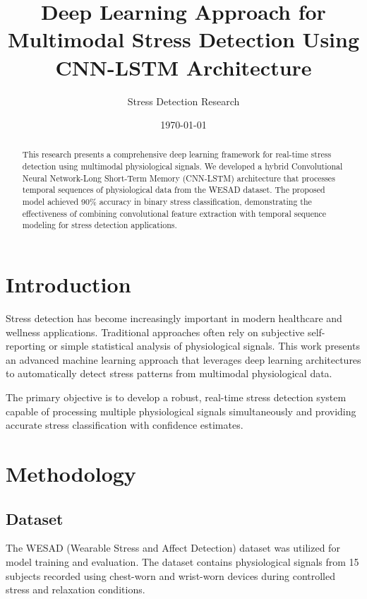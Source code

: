 \documentclass[11pt,a4paper]{article}
\title{Deep Learning Approach for Multimodal Stress Detection Using CNN-LSTM Architecture}
\author{Stress Detection Research}
\date{\today}
\begin{document}
\maketitle

\begin{abstract}
This research presents a comprehensive deep learning framework for real-time stress detection using multimodal physiological signals. We developed a hybrid Convolutional Neural Network-Long Short-Term Memory (CNN-LSTM) architecture that processes temporal sequences of physiological data from the WESAD dataset. The proposed model achieved 90\% accuracy in binary stress classification, demonstrating the effectiveness of combining convolutional feature extraction with temporal sequence modeling for stress detection applications.
\end{abstract}

\section{Introduction}

Stress detection has become increasingly important in modern healthcare and wellness applications. Traditional approaches often rely on subjective self-reporting or simple statistical analysis of physiological signals. This work presents an advanced machine learning approach that leverages deep learning architectures to automatically detect stress patterns from multimodal physiological data.

The primary objective is to develop a robust, real-time stress detection system capable of processing multiple physiological signals simultaneously and providing accurate stress classification with confidence estimates.

\section{Methodology}

\subsection{Dataset}

The WESAD (Wearable Stress and Affect Detection) dataset was utilized for model training and evaluation. The dataset contains physiological signals from 15 subjects recorded using chest-worn and wrist-worn devices during controlled stress and relaxation conditions.
\end{document}
